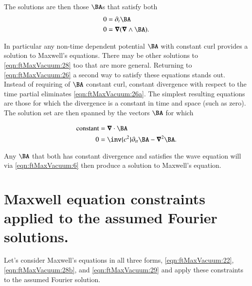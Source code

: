 The solutions are then those $\BA$s that satisfy both
\begin{subequations}
\label{eqn:ftMaxVacuum:28b}
\begin{align}
0 &= \partial_t \BA \\
0 &= \spacegrad (\spacegrad \wedge \BA).
\end{align}
\end{subequations}

In particular any non-time dependent potential $\BA$ with constant curl provides a solution to Maxwell's equations.  There may be other solutions to \autoref{eqn:ftMaxVacuum:28} too that are more general.  Returning to \autoref{eqn:ftMaxVacuum:26} a second way to satisfy these equations stands out.  Instead of requiring of $\BA$ constant curl, constant divergence with respect to the time partial eliminates \autoref{eqn:ftMaxVacuum:26a}.  The simplest resulting equations are those for which the divergence is a constant in time and space (such as zero).  The solution set are then spanned by the vectors $\BA$ for which

\begin{subequations}
\label{eqn:ftMaxVacuum:29}
\begin{align}
\text{constant} &= \spacegrad \cdot \BA 
\label{eqn:ftMaxVacuum:29a}
\\
0 &= \inv{c^2} \partial_{tt} \BA - \spacegrad^2 \BA.
\label{eqn:ftMaxVacuum:29b}
\end{align}
\end{subequations}

Any $\BA$ that both has constant divergence and satisfies the wave equation will via \autoref{eqn:ftMaxVacuum:6} then produce a solution to Maxwell's equation.


\section{Maxwell equation constraints applied to the assumed Fourier solutions.}

Let's consider Maxwell's equations in all three forms, \autoref{eqn:ftMaxVacuum:22}, \autoref{eqn:ftMaxVacuum:28b}, and \autoref{eqn:ftMaxVacuum:29} and apply these constraints to the assumed Fourier solution.

